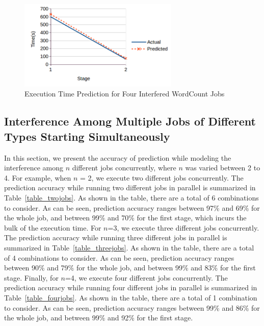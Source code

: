 \begin{figure}[!t]
\centering
\captionsetup{justification=centering}
\includegraphics[width=3in]{figures/wc20g_wcIII.png}
\caption{Execution Time Prediction for Four Interfered WordCount Jobs}
\label{wc20gwcIII}
\end{figure}
\noindent


\subsection{Interference Among Multiple Jobs of Different Types Starting Simultaneously}
\noindent
In this section, we present the accuracy of prediction while modeling the interference among $n$ different jobs concurrently, where $n$ was varied between 2 to 4. For example, when $n$ = 2, we execute two different jobs concurrently. The prediction accuracy while running two different jobs in parallel is summarized in Table~\ref{table_twojobs}. As shown in the table, there are a total of 6 combinations to consider. As can be seen, prediction accuracy ranges between 97\% and 69\% for the whole job, and between 99\% and 70\% for the first stage, which incurs the bulk of the execution time. 
\noindent
For $n$=3, we execute three different jobs concurrently. The prediction accuracy while running three different jobs in parallel is summarized in Table~\ref{table_threejobs}. As shown in the table, there are a total of 4 combinations to consider. As can be seen, prediction accuracy ranges between 90\% and 79\% for the whole job, and between 99\% and 83\% for the first stage.
\noindent
Finally, for $n$=4, we execute four different jobs concurrently. The prediction accuracy while running four different jobs in parallel is summarized in Table~\ref{table_fourjobs}. As shown in the table, there are a total of 1 combination to consider. As can be seen, prediction accuracy ranges between 99\% and 86\% for the whole job, and between 99\% and 92\% for the first stage.
